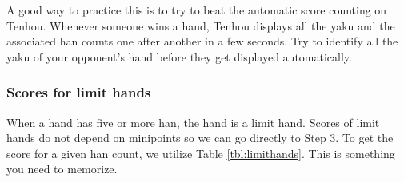 \bigskip

A good way to practice this is to try to beat the automatic score counting on {\jap Tenhou}. Whenever someone wins a hand, {\jap Tenhou} displays all the {\jap yaku} and the associated {\jap han} counts one after another in a few seconds. Try to identify all the {\jap yaku} of your opponent's hand before they get displayed automatically. 

\subsubsection{Scores for limit hands} 
When a hand has five or more {\jap han}, the hand is a limit hand. Scores of limit hands do not depend on minipoints so we can go directly to Step 3. To get the score for a given {\jap han} count, we utilize Table \ref{tbl:limithands}. This is something you need to memorize. 

